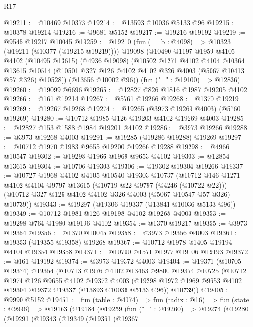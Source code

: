 \begin{lexlean}{R17}
\begin{coremodule}
@19211 := @10469 @10373
@19214 := @13593 @10036 @5133 @96
@19215 := @10378 @19214
@19216 := @9681 @5152
@19217 := @19216 @19192
@19219 := @9545 @19217 @10045
@19259 := @19210
    (fun (__b : @4098) => @10323 (@19211 (@10377 (@19215 @19219))))
    @19098
    (@10490
      @1197
      @1959
      @4105
      @4102
      (@10495 @13615)
      (@4936 @19098)
      (@10502
        @1271
        @4102
        @4104
        @10364
        @13615
        @10514
        (@10501 @327 @126 @4102 @4102 @326 @4003 (@5067 @10413 @57 @326) @10528))
      (@13656 @10002 @96))
    (fun ("_" : @19100) => @12836)
@19260 := @19099 @6696
@19265 := @12827 @826 @1816 @1987 @19205 @4102
@19266 := @161 @19214
@19267 := @5761 @19266
@19268 := @1370 @19219
@19269 := @19267 @19268
@19274 := @19265 (@3973 @19269 @4003) (@5760 @19269)
@19280 := @10712 @1985 @126 @19203 @4102 @19269 @4003
@19285 := @12827 @153 @1588 @1984 @19201 @4102
@19286 := @3973 @19266
@19288 := @3973 @19268 @4003
@19291 := @19285 (@19286 @19288) @19269
@19297 := @10712 @1970 @1983 @9655 @19200 @19266 @19288
@19298 := @4966 @10547
@19302 := @19298 @1966 @1969 @9653 @4102
@19303 := @12854 @13615
@19304 := @10706 @19303
@19306 := @19302 @19304 @19266
@19337 := @10727
    @1968
    @4102
    @4105
    @10540
    @19303
    @10737
    (@10712
      @146
      @1271
      @4102
      @4104
      @9797
      @13615
      (@10719 @22 @9797 (@4246 (@10722 @22)))
      (@10712 @327 @126 @4102 @4102 @326 @4003 (@5067 @10547 @57 @326) @10739))
@19343 := @19297 (@19306 @19337 (@13841 @10036 @5133 @96))
@19349 := @10712 @1981 @126 @19198 @4102 @19268 @4003
@19353 := @19298 @764 @1980 @19196 @4102
@19354 := @1370 @19217
@19355 := @3973 @19354
@19356 := @1370 @10045
@19358 := @3973 @19356 @4003
@19361 := @19353 (@19355 @19358) @19268
@19367 := @10712 @1978 @1405 @19194 @4104 @19354 @19358
@19371 := @10700 @1571 @1977 @19106 @19193
@19372 := @161 @19192
@19374 := @3973 @19372 @4003
@19404 := @19371
    (@10705 @19374)
    @19354
    (@10713
      @1976
      @4102
      @13463
      @9800
      @19374
      @10725
      (@10712
        @1974
        @126
        @9655
        @4102
        @19372
        @4003
        (@19298 @1972 @1969 @9653 @4102 @19304 @19372 @19337 (@13893 @10036 @5133 @96))
        @10739))
@19405 := @9990 @5152
@19451 := fun (table : @4074) =>
  fun (radix : @16) =>
  fun (state : @9996) =>
  @19163
    (@19184
      (@19259
        (fun ("_" : @19260) =>
        @19274
          (@19280
            (@19291
              (@19343
                (@19349
                  (@19361
                    (@19367

\end{coremodule}
\end{lexlean}
